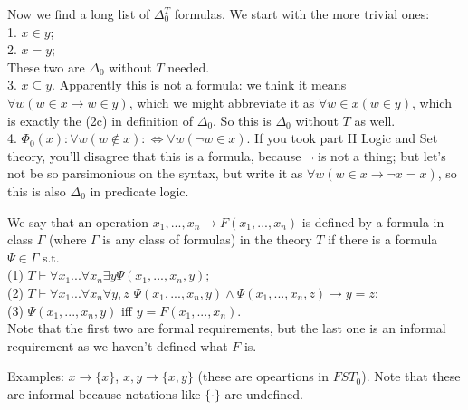 \documentclass[a4paper]{article}
\begin{document}
Now we find a long list of $\Delta_0^T$ formulas. We start with the more trivial ones:\\
1. $x\in y$;\\
2. $x=y$;\\
These two are $\Delta_0$ without $T$ needed.\\
3. $x \subseteq y$. Apparently this is not a formula: we think it means $\forall w (w \in x \to w \in y)$, which we might abbreviate it as $\forall w \in x (w \in y)$, which is exactly the (2c) in definition of $\Delta_0$. So this is $\Delta_0$ without $T$ as well.\\
4. $\Phi_0(x): \forall w (w \not\in x) :\iff \forall w(\neg w \in x)$. If you took part II Logic and Set theory, you'll disagree that this is a formula, because $\neg$ is not a thing; but let's not be so parsimonious on the syntax, but write it as $\forall w (w \in x \to \neg x =x)$, so this is also $\Delta_0$ in predicate logic.

We say that an operation $x_1,...,x_n \to F(x_1,...,x_n)$ is defined by a formula in class $\Gamma$ (where $\Gamma$ is any class of formulas) in the theory $T$ if there is a formula $\Psi \in \Gamma$ s.t. \\
(1) $T \vdash \forall x_1...\forall x_n \exists y \Psi(x_1,...,x_n,y)$;\\
(2) $T \vdash \forall x_1...\forall x_n \forall y,z$ $\Psi(x_1,...,x_n,y) \wedge \Psi(x_1,...,x_n,z) \to y=z$;\\
(3) $\Psi(x_1,...,x_n,y)$ iff $y=F(x_1,...,x_n)$.\\
Note that the first two are formal requirements, but the last one is an informal requirement as we haven't defined what $F$ is.

Examples: $x \to \{x\}$, $x,y \to \{x,y\}$ (these are opeartions in $FST_0$). Note that these are informal because notations like $\{\cdot\}$ are undefined.
\end{document}

